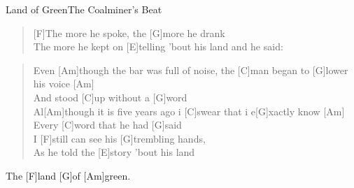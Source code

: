 \begin{song}{Land of Green}{The Coalminer's Beat}
\begin{verse}
        [F]The more he spoke, the [G]more he drank \\
        [F]The more he kept on [E]telling 'bout his land and he said:
    \end{verse}  


    \begin{verse}  
        Even [Am]though the bar was full of noise, the [C]man began to [G]lower his voice [Am] \\
        And stood [C]up without a [G]word \\
        Al[Am]though it is five years ago i [C]swear that i e[G]xactly know [Am] \\
        Every [C]word that he had [G]said \\

        I [F]still can see his [G]trembling hands,\\
        [F]As he told the [E]story 'bout his land
    \end{verse}  


    \begin{guitarMagic}
        The [F]land [G]of [Am]green. \\
    \end{guitarMagic}

\end{song}
